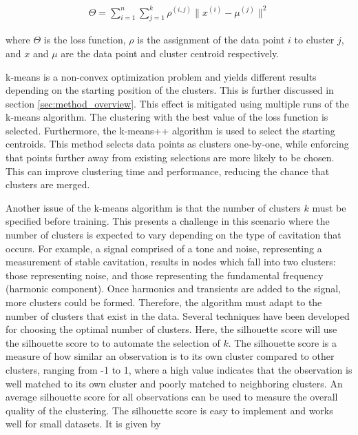 \documentclass[preprint, linenumbers]{revtex4-2}
\newcommand{\km}{k-means }
\begin{document}
\begin{align}
	\Theta = \sum_{i=1}^{n}{\sum_{j=1}^{k}{\rho^{(i,j)} \lVert x^{(i)} - \mu^{(j)} \rVert^2}} 
	\label{eq:kmeans}                                                                         
\end{align}

\noindent where $\Theta$ is the loss function, $\rho$ is the assignment of the data point $i$ to cluster $j$, and $x$ and $\mu$ are the data point and cluster centroid respectively. 

\km is a non-convex optimization problem and yields different results depending on the starting position of the clusters. This is further discussed in section \ref{sec:method_overview}. This effect is mitigated using multiple runs of the \km algorithm. The clustering with the best value of the loss function is selected. Furthermore, the k-means++ algorithm \cite{arthur2007} is used to select the starting centroids. This method selects data points as clusters one-by-one, while enforcing that points further away from existing selections are more likely to be chosen. This can improve clustering time and performance, reducing the chance that clusters are merged.

Another issue of the \km algorithm is that the number of clusters $k$ must be specified before training. This presents a challenge in this scenario where the number of clusters is expected to vary depending on the type of cavitation that occurs. For example, a signal comprised of a tone and noise, representing a measurement of stable cavitation, results in nodes which fall into two clusters: those representing noise, and those representing the fundamental frequency (harmonic component). Once harmonics and transients are added to the signal, more clusters could be formed. Therefore, the algorithm must adapt to the number of clusters that exist in the data. Several techniques have been developed for choosing the optimal number of clusters. \cite{schubert2022stop, yuan2019research} Here, the silhouette score will use the silhouette score to to automate the selection of $k$. The silhouette score is a measure of how similar an observation is to its own cluster compared to other clusters, ranging from -1 to 1, where a high value indicates that the observation is well matched to its own cluster and poorly matched to neighboring clusters. An average silhouette score for all observations can be used to measure the overall quality of the clustering. The silhouette score is easy to implement and works well for small datasets. \cite{shahapure2020cluster} It is given by
\end{document}
